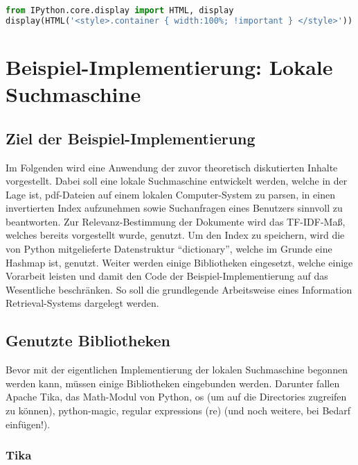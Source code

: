 \begin{lstlisting}[language=Python]
from IPython.core.display import HTML, display
display(HTML('<style>.container { width:100%; !important } </style>'))
\end{lstlisting}

\section{Beispiel-Implementierung: Lokale
Suchmaschine}\label{beispiel-implementierung-lokale-suchmaschine}

\subsection{Ziel der
Beispiel-Implementierung}\label{ziel-der-beispiel-implementierung}

Im Folgenden wird eine Anwendung der zuvor theoretisch diskutierten
Inhalte vorgestellt. Dabei soll eine lokale Suchmaschine entwickelt
werden, welche in der Lage ist, pdf-Dateien auf einem lokalen
Computer-System zu parsen, in einen invertierten Index aufzunehmen sowie
Suchanfragen eines Benutzers sinnvoll zu beantworten. Zur
Relevanz-Bestimmung der Dokumente wird das TF-IDF-Maß, welches bereits
vorgestellt wurde, genutzt. Um den Index zu speichern, wird die von
Python mitgelieferte Datenstruktur ``dictionary'', welche im Grunde eine
Hashmap ist, genutzt. Weiter werden einige Bibliotheken eingesetzt,
welche einige Vorarbeit leisten und damit den Code der
Beispiel-Implementierung auf das Wesentliche beschränken. So soll die
grundlegende Arbeitsweise eines Information Retrieval-Systems dargelegt
werden.

\subsection{Genutzte Bibliotheken}\label{genutzte-bibliotheken}

Bevor mit der eigentlichen Implementierung der lokalen Suchmaschine
begonnen werden kann, müssen einige Bibliotheken eingebunden werden.
Darunter fallen Apache Tika, das Math-Modul von Python, os (um auf die
Directories zugreifen zu können), python-magic, regular expressions (re)
(und noch weitere, bei Bedarf einfügen!).

\subsubsection{Tika}\label{tika}

